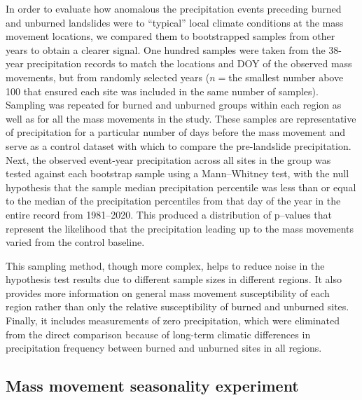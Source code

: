 \documentclass[nhess, manuscript]{copernicus}
\begin{document}
In order to evaluate how anomalous the precipitation events  preceding burned and unburned 
landslides were to “typical” local climate conditions at the mass movement locations, we compared 
them to bootstrapped samples from other years to obtain a clearer signal.  One
hundred samples were taken from the 38-year precipitation records to
match the locations and DOY of the observed mass movements, but
from randomly selected years (\(n=\)the smallest number above 100 that ensured each site was included in the same number of samples).
Sampling was repeated for burned and unburned groups within each region
as well as for all the mass movements in the study. These samples are
representative of precipitation for a particular number of days before the mass movement
and serve as a control dataset with which to compare
the pre-landslide precipitation. Next, the observed event-year
precipitation across all sites in the group was tested against each
bootstrap sample using a Mann--Whitney test, with the null
hypothesis that the sample median precipitation percentile was less than or equal to the median
of the precipitation percentiles from that day of the year in the entire
record from 1981--2020. This produced a distribution
of p--values that represent the likelihood that the precipitation leading
up to the mass movements varied from the control baseline.

This sampling method, though more complex, helps to reduce noise in the
hypothesis test results due to different sample sizes in different
regions. It also provides more information on general mass movement
susceptibility of each region rather than only the relative
susceptibility of burned and unburned sites. Finally, it includes
measurements of zero precipitation, which were eliminated from
the direct comparison because of long-term climatic differences in
precipitation frequency between burned and unburned sites in all
regions.


\subsection{Mass movement seasonality experiment}\label{sec:method-seasonality}
\end{document}
